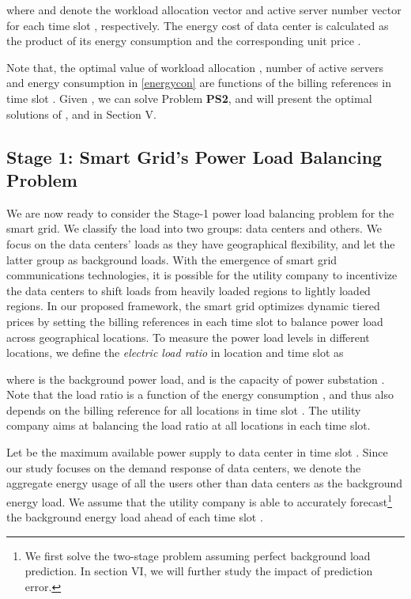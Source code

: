 \documentclass[journal]{IEEEtran}
\begin{document}
	where  and  denote the workload allocation vector and active server number vector for each time slot , respectively. The energy cost of data center  is calculated as the product of its energy consumption  and the corresponding unit price .
	
	Note that, the optimal value of workload allocation , number of active servers  and energy consumption  in \eqref{energycon} are functions of the billing references  in time slot . Given , we can solve Problem \textbf{PS2}, and will present the optimal solutions of ,  and  in Section V.
	
	
	
	\subsection{Stage 1: Smart Grid's Power Load Balancing Problem}
	We are now ready to consider the Stage-1 power load balancing problem for the smart grid. We classify the load into two groups: data centers and others. We focus on the data centers' loads as they have geographical flexibility, and let the latter group as background loads. With the emergence of smart grid communications technologies, it is possible for the utility company to incentivize the data centers to shift loads from heavily loaded regions to lightly loaded regions. In our proposed framework, the smart grid optimizes dynamic tiered prices by setting the billing references  in each time slot  to balance power load across geographical locations. To measure the power load levels in different locations, we define the \emph{electric load ratio} in location  and time slot  as
	
	where  is the background power load, and  is the capacity of power substation . Note that the load ratio  is a function of the energy consumption , and thus also depends on the billing reference  for all locations in time slot . The utility company aims at balancing the load ratio  at all locations in each time slot.
	
	Let  be the maximum available power supply to data center  in time slot . Since our study focuses on the demand response of data centers, we denote the aggregate energy usage of all the users other than data centers as the background energy load. We assume that the utility company is able to accurately forecast\footnote{We first solve the two-stage problem assuming perfect background load prediction. In section VI, we will further study the impact of prediction error.} the background energy load ahead of each time slot \cite{predict}.
	
\end{document}
